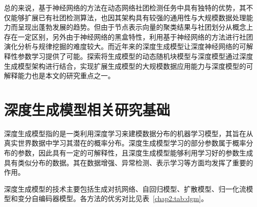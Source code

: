 总的来说，基于神经网络的方法在动态网络社团检测任务中具有独特的优势，其不仅能够扩展已有社团检测算法，也因其架构具有较强的通用性与大规模数据处理能力而呈现出蓬勃发展的趋势。但由于节点表示向量的聚类结果与社团划分从概念上存在一定区别，另外由于神经网络的黑盒特性，利用基于神经网络的方法进行社团演化分析与规律挖掘的难度较大。而近年来的深度生成模型让深度神经网络的可解释性参数学习提供了可能。探索将生成模型的动态随机块模型与深度模型通过深度生成模型架构进行结合，实现扩展生成模型的大规模数据应用能力与深度模型的可解释能力也是本文的研究重点之一。
\section{深度生成模型相关研究基础}

深度生成模型指的是一类利用深度学习来建模数据分布的机器学习模型，其旨在从真实世界数据中学习其潜在的概率分布。深度生成模型学习的部分参数属于概率分布的参数，因此具有一定的可解释性，且深度生成模型能够利用学习好的参数生成具有类似分布的数据。其在数据增强、异常检测、表示学习等方面均发挥了重要的作用\cite{foster2022generative,oussidi2018deep}。

深度生成模型的技术主要包括生成对抗网络\cite{goodfellow2020generative}、自回归模型\cite{you2018graphrnn}、扩散模型\cite{kingma2021variational}、归一化流模型\cite{papamakarios2021normalizing}和变分自编码器模型\cite{pinheiro2021variational}。各方法的优劣对比见表~\ref{chap2:tab:dgm}。

\begin{table}[htbp]
	\caption{深度生成模型各技术对比简表}
	\vspace{0.5em}\centering\wuhao
	\label{chap2:tab:dgm}
\end{table}

